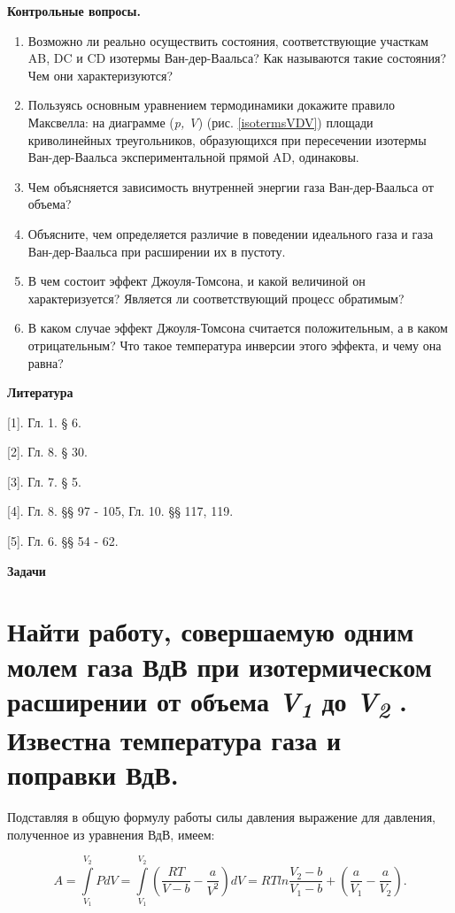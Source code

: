 \textbf{Контрольные вопросы.}

\begin{enumerate}
\def\labelenumi{\arabic{enumi}.}
\item Возможно ли реально осуществить состояния, соответствующие участкам
  AB, DC и CD изотермы Ван-дер-Ваальса? Как называются такие состояния?
  Чем они характеризуются?
\item Пользуясь основным уравнением термодинамики докажите правило
  Максвелла: на диаграмме (\emph{p, V}) (рис. \ref{isotermsVDV}) площади криволинейных
  треугольников, образующихся при пересечении изотермы Ван-дер-Ваальса
  экспериментальной прямой AD, одинаковы.
\item Чем объясняется зависимость внутренней энергии газа Ван-дер-Ваальса от
  объема?
\item Объясните, чем определяется различие в поведении идеального газа и
  газа Ван-дер-Ваальса при расширении их в пустоту.
\item В чем состоит эффект Джоуля-Томсона, и какой величиной он
  характеризуется? Является ли соответствующий процесс обратимым?
\item В каком случае эффект Джоуля-Томсона считается положительным, а в
  каком отрицательным? Что такое температура инверсии этого эффекта, и
  чему она равна?
\end{enumerate}

\textbf{Литература}

{[}1{]}. Гл. 1. § 6.

{[}2{]}. Гл. 8. § 30.

{[}3{]}. Гл. 7. § 5.

{[}4{]}. Гл. 8. §§ 97 - 105, Гл. 10. §§ 117, 119.

{[}5{]}. Гл. 6. §§ 54 - 62.

\textbf{Задачи}

\section{Найти работу, совершаемую одним молем газа ВдВ при
изотермическом расширении от объема \emph{V\textsubscript{1}} до
\emph{V\textsubscript{2}} . Известна температура газа и поправки ВдВ.}

\solving{}

Подставляя в общую формулу работы силы давления выражение для давления,
полученное из уравнения ВдВ, имеем:

\begin{equation}
  A = \int\limits_{V_1}^{V_2} PdV = \int\limits_{V_1}^{V_2} \left (  \frac{RT}{V-b} - \frac{a}{V^2}\right )dV = RTln\frac{V_2-b}{V_1-b} + \left ( \frac{a}{V_1} - \frac{a}{V_2}\right ).
\end{equation}

